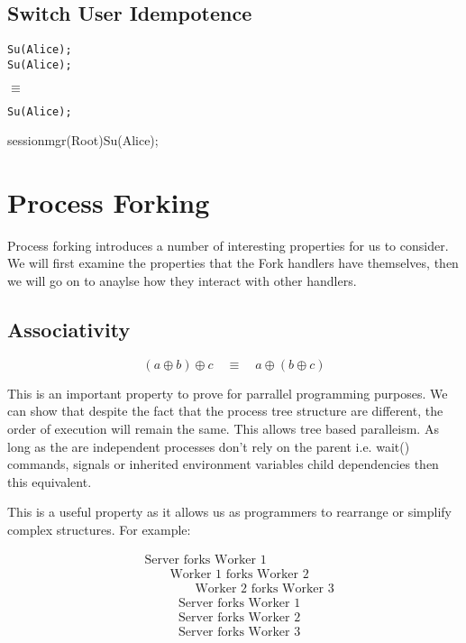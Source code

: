 \documentclass[logo,bsc,singlespacing,parskip]{infthesis}
\begin{document}
\subsection*{Switch User Idempotence}

\begin{lstlisting}
Su(Alice);
Su(Alice);
\end{lstlisting}
$\equiv$
\begin{lstlisting}
Su(Alice);
\end{lstlisting}

{}{sessionmgr(Root)}{Su(Alice);}

\section{Process Forking}
Process forking introduces a number of interesting properties for us to consider. We will first examine the properties that the Fork handlers have themselves, then we will go on to anaylse how they interact with other handlers. 

\subsection*{Associativity}

\[
(a \oplus b) \oplus c \quad \equiv \quad a \oplus (b \oplus c)
\]

This is an important property to prove for parrallel programming purposes. We can show that despite the fact that the process tree structure are different, the order of execution will remain the same. This allows tree based paralleism. As long as the are independent processes don't rely on the parent i.e. wait() commands, signals or inherited environment variables child dependencies then this equivalent.

This is a useful property as it allows us as programmers to rearrange or simplify complex structures.
For example:

\[
\begin{aligned}
    &\text{Server forks Worker 1} \\
    &\quad\quad \text{Worker 1 forks Worker 2} \\
    &\quad\quad\quad\quad \text{Worker 2 forks Worker 3}
\end{aligned}
\]
\[
\begin{aligned}
    &\text{Server forks Worker 1} \\
    &\text{Server forks Worker 2} \\
    &\text{Server forks Worker 3}
\end{aligned}
\]
\end{document}
